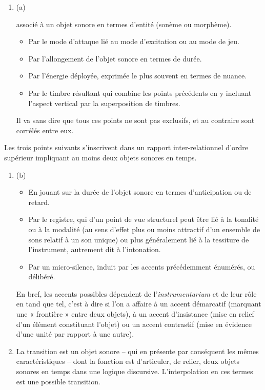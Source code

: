 \begin{enumerate}
\item (a)  

associé à un objet sonore en termes d’entité (sonème ou morphème).

\begin{itemize}
\item Par le mode d’attaque lié au mode d’excitation ou au mode de jeu.
\item Par l'allongement de l'objet sonore en termes de durée.
\item Par l’énergie déployée, exprimée le plus souvent en termes de nuance. 
\item Par le timbre résultant qui combine les points précédents en y incluant l'aspect vertical par la superposition de timbres.
\end{itemize}
Il va sans dire que tous ces points ne sont pas exclusifs, et au contraire sont corrélés entre eux.
 \end{enumerate}
Les trois points suivants s’inscrivent dans un rapport inter-relationnel d’ordre supérieur impliquant au moins deux objets sonores en temps.
\begin{enumerate}
\item (b) 
\begin{itemize}
\item En jouant sur la durée de l'objet sonore en termes d'anticipation ou de retard.
\item Par le registre, qui d’un point de vue structurel peut être lié à la tonalité ou à la modalité (au sens d’effet plus ou moins attractif d’un ensemble de sons relatif à un son unique) ou plus généralement lié à la tessiture de l'instrument, autrement dit à l’intonation.
\item Par un micro-silence, induit par les accents précédemment énumérés, ou délibéré.
\end{itemize}

En bref, les accents possibles dépendent de l'\textit{instrumentarium} et de leur rôle en tand que tel, c’est à dire si l’on a affaire à un accent démarcatif (marquant une « frontière » entre deux objets), à un accent d’insistance (mise en relief d'un élément constituant l'objet) ou un accent contrastif (mise en évidence d'une unité par rapport à une autre).

\item {}

La transition est un objet sonore -- qui en présente par conséquent les mêmes caractéristiques --  dont la fonction est d'articuler, de relier, deux objets sonores en temps dans une logique discursive. L’interpolation en ces termes est une possible transition.

 \end{enumerate}
